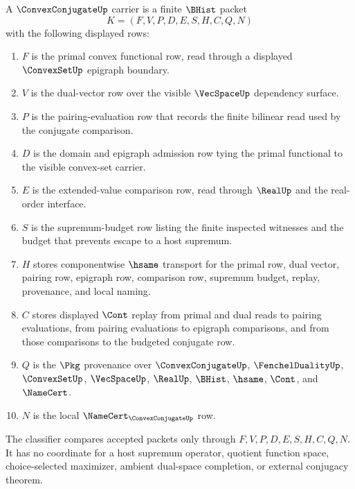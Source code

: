 \begin{definition}\label{def:convex-conjugate-carrier}
A $\ConvexConjugateUp$ carrier is a finite $\BHist$ packet
$$
K=(F,V,P,D,E,S,H,C,Q,N)
$$
with the following displayed rows:
\begin{enumerate}
\item $F$ is the primal convex functional row, read through a displayed $\ConvexSetUp$ epigraph boundary.
\item $V$ is the dual-vector row over the visible $\VecSpaceUp$ dependency surface.
\item $P$ is the pairing-evaluation row that records the finite bilinear read used by the conjugate comparison.
\item $D$ is the domain and epigraph admission row tying the primal functional to the visible convex-set carrier.
\item $E$ is the extended-value comparison row, read through $\RealUp$ and the real-order interface.
\item $S$ is the supremum-budget row listing the finite inspected witnesses and the budget that prevents escape to a host supremum.
\item $H$ stores componentwise $\hsame$ transport for the primal row, dual vector, pairing row, epigraph row, comparison row, supremum budget, replay, provenance, and local naming.
\item $C$ stores displayed $\Cont$ replay from primal and dual reads to pairing evaluations, from pairing evaluations to epigraph comparisons, and from those comparisons to the budgeted conjugate row.
\item $Q$ is the $\Pkg$ provenance over $\ConvexConjugateUp$, $\FenchelDualityUp$, $\ConvexSetUp$, $\VecSpaceUp$, $\RealUp$, $\BHist$, $\hsame$, $\Cont$, and $\NameCert$.
\item $N$ is the local $\NameCert_{\ConvexConjugateUp}$ row.
\end{enumerate}
The classifier compares accepted packets only through $F,V,P,D,E,S,H,C,Q,N$. It has no coordinate for a host supremum operator, quotient function space, choice-selected maximizer, ambient dual-space completion, or external conjugacy theorem.
\end{definition}

